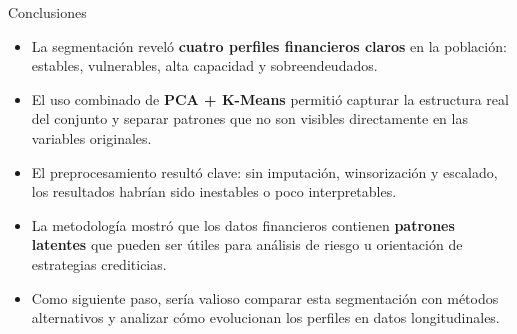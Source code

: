 \documentclass[10pt]{beamer}
\begin{document}
\begin{frame}{Conclusiones}

\begin{itemize}
    \item La segmentación reveló \textbf{cuatro perfiles financieros claros} en la población:
    estables, vulnerables, alta capacidad y sobreendeudados.
    
    \vspace{0.25cm}
    \item El uso combinado de \textbf{PCA + K-Means} permitió capturar la estructura real del
    conjunto y separar patrones que no son visibles directamente en las variables originales.
    
    \vspace{0.25cm}
    \item El preprocesamiento resultó clave: sin imputación, winsorización y escalado,
    los resultados habrían sido inestables o poco interpretables.
    
    \vspace{0.25cm}
    \item La metodología mostró que los datos financieros contienen \textbf{patrones latentes}
    que pueden ser útiles para análisis de riesgo u orientación de estrategias crediticias.
    
    \vspace{0.25cm}
    \item Como siguiente paso, sería valioso comparar esta segmentación con métodos alternativos
    y analizar cómo evolucionan los perfiles en datos longitudinales.
\end{itemize}

\end{frame}
\end{document}
